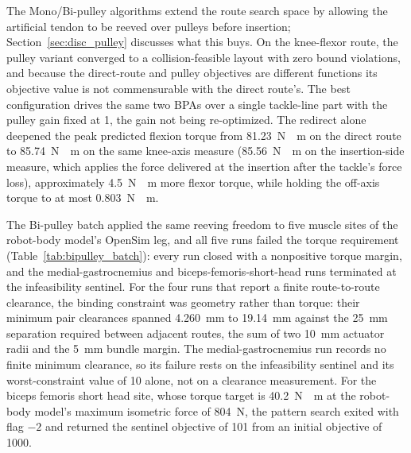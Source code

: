 The Mono/Bi-pulley algorithms extend the route search space by allowing the artificial tendon to be reeved over pulleys before insertion; Section~\ref{sec:disc_pulley} discusses what this buys. On the knee-flexor route, the pulley variant converged to a collision-feasible layout with zero bound violations, and because the direct-route and pulley objectives are different functions its objective value is not commensurable with the direct route's. The best configuration drives the same two BPAs over a single tackle-line part with the pulley gain fixed at 1, the gain not being re-optimized. The redirect alone deepened the peak predicted flexion torque from \qty{81.23}{\newton\cdot\meter} on the direct route to \qty{85.74}{\newton\cdot\meter} on the same knee-axis measure (\qty{85.56}{\newton\cdot\meter} on the insertion-side measure, which applies the force delivered at the insertion after the tackle's force loss), approximately \qty{4.5}{\newton\cdot\meter} more flexor torque, while holding the off-axis torque to at most \qty{0.803}{\newton\cdot\meter}.

The Bi-pulley batch applied the same reeving freedom to five muscle sites of the robot-body model's OpenSim leg, and all five runs failed the torque requirement (Table~\ref{tab:bipulley_batch}): every run closed with a nonpositive torque margin, and the medial-gastrocnemius and biceps-femoris-short-head runs terminated at the infeasibility sentinel. For the four runs that report a finite route-to-route clearance, the binding constraint was geometry rather than torque: their minimum pair clearances spanned \qty{4.260}{\mm} to \qty{19.14}{\mm} against the \qty{25}{\mm} separation required between adjacent routes, the sum of two \qty{10}{\mm} actuator radii and the \qty{5}{\mm} bundle margin. The medial-gastrocnemius run records no finite minimum clearance, so its failure rests on the infeasibility sentinel and its worst-constraint value of 10 alone, not on a clearance measurement. For the biceps femoris short head site, whose torque target is \qty{40.2}{\newton\cdot\meter} at the robot-body model's maximum isometric force of \qty{804}{\N}, the pattern search exited with flag $-2$ and returned the sentinel objective of 101 from an initial objective of 1000.

